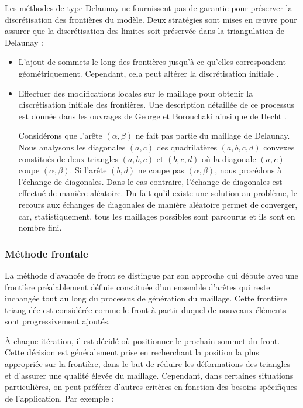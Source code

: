 Les méthodes de type Delaunay ne fournissent pas de garantie pour préserver la discrétisation des frontières du modèle. Deux stratégies sont mises en œuvre pour assurer que la discrétisation des limites soit préservée dans la triangulation de Delaunay \cite{botella2016generation}:\\

\begin{itemize}
    \item L'ajout de sommets le long des frontières jusqu'à ce qu'elles correspondent géométriquement. Cependant, cela peut altérer la discrétisation initiale \cite{cohen2002conforming}.\\
    \item Effectuer des modifications locales sur le maillage pour obtenir la discrétisation initiale des frontières. Une description détaillée de ce processus est donnée dans les ouvrages de George et Borouchaki \cite{george1997triangulation} ainsi que de Hecht \cite{hecht2007maillage}.
    
    Considérons que l'arête $(\alpha, \beta)$ ne fait pas partie du maillage de Delaunay. Nous analysons les diagonales $(a, c)$ des quadrilatères $(a, b, c, d)$ convexes constitués de deux triangles $(a, b, c)$ et $(b, c, d)$ où la diagonale $(a, c)$ coupe $(\alpha, \beta)$. Si l'arête $(b, d)$ ne coupe pas $(\alpha, \beta)$, nous procédons à l'échange de diagonales. Dans le cas contraire, l'échange de diagonales est effectué de manière aléatoire. Du fait qu'il existe une solution au problème, le recours aux échanges de diagonales de manière aléatoire permet de converger, car, statistiquement, tous les maillages possibles sont parcourus et ils sont en nombre fini.
\end{itemize}


\subsubsection{Méthode frontale}

La méthode d'avancée de front \cite{george1994advancing, lohner1996progress, lohner2014recent} se distingue par son approche qui débute avec une frontière préalablement définie constituée d'un ensemble d'arêtes qui reste inchangée tout au long du processus de génération du maillage. Cette frontière triangulée est considérée comme le front à partir duquel de nouveaux éléments sont progressivement ajoutés.

À chaque itération, il est décidé où positionner le prochain sommet du front. Cette décision est généralement prise en recherchant la position la plus appropriée sur la frontière, dans le but de réduire les déformations des triangles et d'assurer une qualité élevée du maillage. Cependant, dans certaines situations particulières, on peut préférer d'autres critères en fonction des besoins spécifiques de l'application. Par exemple :\\

